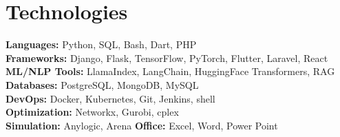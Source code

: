 \documentclass[10pt, letterpaper]{article}
\begin{document}
\section*{Technologies}
\small
\begin{multicols}{2}
    \textbf{Languages:} Python, SQL, Bash, Dart, PHP \\
    \textbf{Frameworks:} Django, Flask, TensorFlow, PyTorch, Flutter, Laravel, React \\
    \textbf{ML/NLP Tools:} LlamaIndex, LangChain, HuggingFace Transformers, RAG \\
    \textbf{Databases:} PostgreSQL, MongoDB, MySQL \\
    \textbf{DevOps:} Docker, Kubernetes, Git, Jenkins, shell \\
    \textbf{Optimization:} Networkx, Gurobi, cplex\\ 
    \textbf{Simulation:} Anylogic, Arena
    \textbf{Office:} Excel, Word, Power Point\\

\end{multicols}
\end{document}
